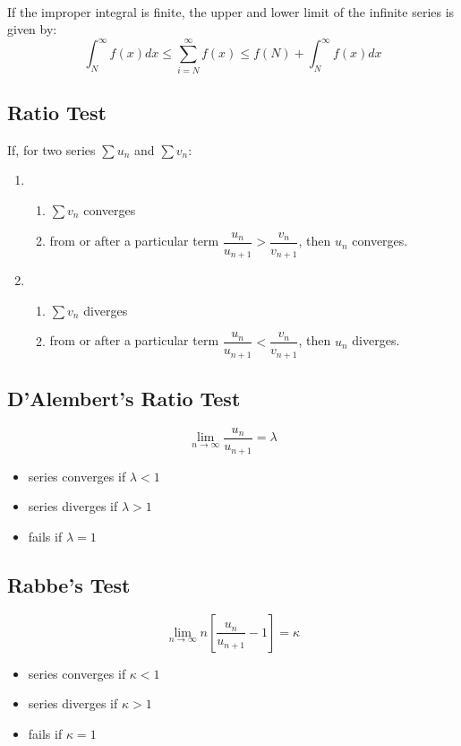 \documentclass[../main.tex]{subfiles}
\begin{document}
	\paragraph{}
	If the improper integral is finite, the upper and lower limit of the infinite series is given by:
	\begin{equation}
		\int_{N}^{\infty} f(x) dx \leq \sum_{i=N}^{\infty} f(x) \leq f(N)+\int_{N}^{\infty} f(x) dx
	\end{equation}
	\subsection{Ratio Test}
	If, for two series $\sum u_n$ and $\sum v_n$:
	
	\begin{enumerate}
		\item \begin{enumerate}
			\item $\sum v_n$ converges
			\item from or after a particular term $\dfrac{u_n}{u_{n+1}}>\dfrac{v_n}{v_{n+1}}$, then $u_n$ converges.
			\end{enumerate}
		\item \begin{enumerate}
			\item $\sum v_n$ diverges
			\item from or after a particular term $\dfrac{u_n}{u_{n+1}}<\dfrac{v_n}{v_{n+1}}$, then $u_n$ diverges.
		\end{enumerate}
	\end{enumerate}
	
	\subsection{D'Alembert's Ratio Test}
	\begin{equation}
		\lim_{n\to\infty} \dfrac{u_n}{u_{n+1}}=\lambda
	\end{equation}
	\begin{itemize}
		\item series converges if $\lambda<1$
		\item series diverges if $\lambda>1$
		\item fails if $\lambda=1$
	\end{itemize}
	
	\subsection{Rabbe's Test}
	\begin{equation}
		\lim_{n\to\infty} n\left[ \dfrac{u_n}{u_{n+1}} - 1 \right] = \kappa
	\end{equation}
	\begin{itemize}
		\item series converges if $\kappa<1$
		\item series diverges if $\kappa>1$
		\item fails if $\kappa=1$
	\end{itemize}
	
\end{document}
